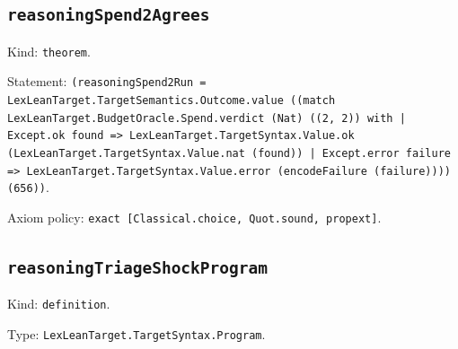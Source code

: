 \documentclass[11pt]{article}
\begin{document}
\subsection*{\texttt{reasoningSpend2Agrees}}
\noindent Kind: \texttt{theorem}.\par
\noindent Statement: \texttt{(reasoningSpend2Run = LexLeanTarget.TargetSemantics.Outcome.value ((match LexLeanTarget.BudgetOracle.Spend.verdict (Nat) ((2, 2)) with | Except.ok found => LexLeanTarget.TargetSyntax.Value.ok (LexLeanTarget.TargetSyntax.Value.nat (found)) | Except.error failure => LexLeanTarget.TargetSyntax.Value.error (encodeFailure (failure)))) (656))}.\par
\noindent Axiom policy: \texttt{exact [Classical.choice, Quot.sound, propext]}.\par
\subsection*{\texttt{reasoningTriageShockProgram}}
\noindent Kind: \texttt{definition}.\par
\noindent Type: \texttt{LexLeanTarget.TargetSyntax.Program}.\par
\end{document}

